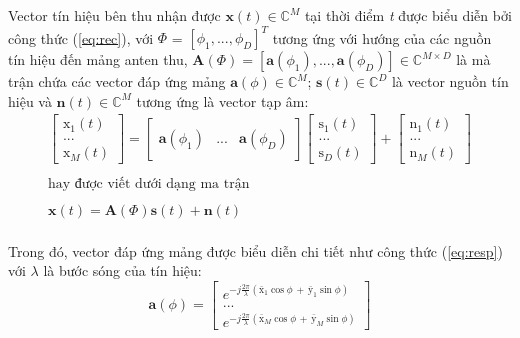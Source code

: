 Vector tín hiệu bên thu nhận được $\mathbf{x}(t) \in \mathbb{C}^{M}$  tại thời điểm \textit{t} được biểu diễn bởi công thức (\ref{eq:rec}), với $\Phi$ = $[\phi_{1}, ..., \phi_{D}]^{T}$ tương ứng với hướng của các nguồn tín hiệu đến mảng anten thu, $\mathbf{A}(\Phi) = [\mathbf{a}(\phi_{1}), ..., \mathbf{a}(\phi_{D})] \in \mathbb{C}^{M  \times D}$ là mà trận chứa các vector đáp ứng mảng $\mathbf{a}(\phi) \in \mathbb{C}^{M}$; $\mathbf{s}(t) \in \mathbb{C}^{D}$ là vector nguồn tín hiệu và $\mathbf{n}(t) \in \mathbb{C}^{M}$ tương ứng là vector tạp âm:
\begin{equation}
\begin{matrix}
\begin{bmatrix}
\mathrm{x}_{1}(t) \\
... \\
\mathrm{x}_{M}(t)
\end{bmatrix}
=
\begin{bmatrix}
 &  & \\ 
\mathbf{a}(\phi_{1}) &...  &\mathbf{a}(\phi_{D})\\ 
 &  & 
\end{bmatrix}
\begin{bmatrix}
\mathrm{s}_{1}(t)\\ 
...\\ 
\mathrm{s}_{D}(t)
\end{bmatrix}
+
\begin{bmatrix}
\mathrm{n}_{1}(t)\\ 
...\\ 
\mathrm{n}_{M}(t)
\end{bmatrix}\\  
\\ \textrm{hay được viết dưới dạng ma trận}\\ \\
\mathbf{x}(t) = \mathbf{A}(\Phi)\mathbf{s}(t) + \mathbf{n}(t)\\ 
\end{matrix}
\label{eq:rec}
\end{equation}

Trong đó, vector đáp ứng mảng được biểu diễn chi tiết như công thức (\ref{eq:resp}) với $\lambda$ là bước sóng của tín hiệu:
\begin{equation}
\mathbf{a}(\phi) = 
\begin{bmatrix}
e^{-j\frac{2\pi}{\lambda}(\bar{\mathrm{x}}_{1}\cos\phi \,+\, \bar{\mathrm{y}}_{1}\sin\phi)}\\ 
...\\ 
e^{-j\frac{2\pi}{\lambda}(\bar{\mathrm{x}}_{M}\cos\phi \,+\, \bar{\mathrm{y}}_{M}\sin\phi)}
\end{bmatrix}
\label{eq:resp}
\end{equation}

